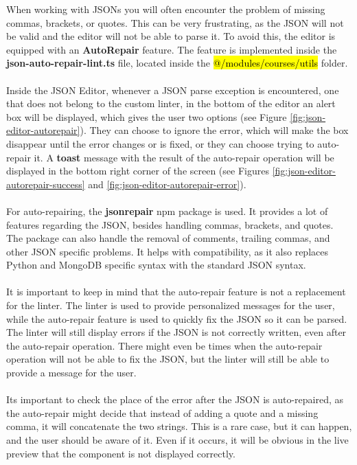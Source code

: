 \noindent When working with JSONs you will often encounter the problem of missing commas, brackets, or quotes. This can be very frustrating, as the JSON will not be valid and the editor will not be able to parse it. To avoid this, the editor is equipped with an \textbf{AutoRepair} feature. The feature is implemented inside the \textbf{json-auto-repair-lint.ts} file, located inside the \hl{@/modules/courses/utils} folder.
\\\\
\noindent Inside the JSON Editor, whenever a JSON parse exception is encountered, one that does not belong to the custom linter, in the bottom of the editor an alert box will be displayed, which gives the user two options (see Figure \ref{fig:json-editor-autorepair}). They can choose to ignore the error, which will make the box disappear until the error changes or is fixed, or they can choose trying to auto-repair it. A \textbf{toast} message with the result of the auto-repair operation will be displayed in the bottom right corner of the screen (see Figures \ref{fig:json-editor-autorepair-success} and \ref{fig:json-editor-autorepair-error}).
\\\\
\noindent For auto-repairing, the \textbf{jsonrepair} npm package is used. It provides a lot of features regarding the JSON, besides handling commas, brackets, and quotes. The package can also handle the removal of comments, trailing commas, and other JSON specific problems. It helps with compatibility, as it also replaces Python and MongoDB specific syntax with the standard JSON syntax.
\\\\
\noindent It is important to keep in mind that the auto-repair feature is not a replacement for the linter. The linter is used to provide personalized messages for the user, while the auto-repair feature is used to quickly fix the JSON so it can be parsed. The linter will still display errors if the JSON is not correctly written, even after the auto-repair operation. There might even be times when the auto-repair operation will not be able to fix the JSON, but the linter will still be able to provide a message for the user.
\\\\
\noindent Its important to check the place of the error after the JSON is auto-repaired, as the auto-repair might decide that instead of adding a quote and a missing comma, it will concatenate the two strings. This is a rare case, but it can happen, and the user should be aware of it. Even if it occurs, it will be obvious in the live preview that the component is not displayed correctly.


